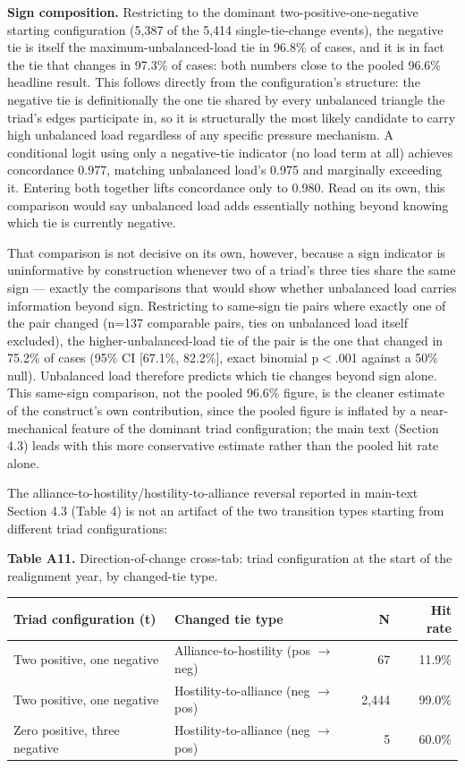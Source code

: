 \documentclass[Afour,sageh,times,doublespace]{sagej}
\begin{document}
\textbf{Sign composition.} Restricting to the dominant two-positive-one-negative starting configuration (5,387 of the 5,414 single-tie-change events), the negative tie is itself the maximum-unbalanced-load tie in 96.8\% of cases, and it is in fact the tie that changes in 97.3\% of cases: both numbers close to the pooled 96.6\% headline result. This follows directly from the configuration's structure: the negative tie is definitionally the one tie shared by every unbalanced triangle the triad's edges participate in, so it is structurally the most likely candidate to carry high unbalanced load regardless of any specific pressure mechanism. A conditional logit using only a negative-tie indicator (no load term at all) achieves concordance 0.977, matching unbalanced load's 0.975 and marginally exceeding it. Entering both together lifts concordance only to 0.980. Read on its own, this comparison would say unbalanced load adds essentially nothing beyond knowing which tie is currently negative.

That comparison is not decisive on its own, however, because a sign indicator is uninformative by construction whenever two of a triad's three ties share the same sign --- exactly the comparisons that would show whether unbalanced load carries information beyond sign. Restricting to same-sign tie pairs where exactly one of the pair changed (n=137 comparable pairs, ties on unbalanced load itself excluded), the higher-unbalanced-load tie of the pair is the one that changed in 75.2\% of cases (95\% CI [67.1\%, 82.2\%], exact binomial p$<$.001 against a 50\% null). Unbalanced load therefore predicts which tie changes beyond sign alone. This same-sign comparison, not the pooled 96.6\% figure, is the cleaner estimate of the construct's own contribution, since the pooled figure is inflated by a near-mechanical feature of the dominant triad configuration; the main text (Section 4.3) leads with this more conservative estimate rather than the pooled hit rate alone.

The alliance-to-hostility/hostility-to-alliance reversal reported in main-text Section 4.3 (Table 4) is not an artifact of the two transition types starting from different triad configurations:

\begin{table}[t]
\centering
\textbf{Table A11.} Direction-of-change cross-tab: triad configuration at the start of the realignment year, by changed-tie type.

\vspace{4pt}
{\small\sf
\begin{tabular}{llrr}
\toprule
Triad configuration (t) & Changed tie type & N & Hit rate\\
\midrule
Two positive, one negative & Alliance-to-hostility (pos $\rightarrow$ neg) & 67 & 11.9\%\\
Two positive, one negative & Hostility-to-alliance (neg $\rightarrow$ pos) & 2,444 & 99.0\%\\
Zero positive, three negative & Hostility-to-alliance (neg $\rightarrow$ pos) & 5 & 60.0\%\\
\bottomrule
\end{tabular}
\par}
\end{table}
\end{document}
